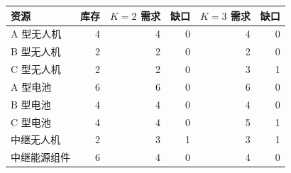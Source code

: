 \begin{tabular}{lrrrrr}
\toprule
资源 & 库存 & $K=2$ 需求 & 缺口 & $K=3$ 需求 & 缺口 \\
\midrule
A 型无人机 & 4 & 4 & 0 & 4 & 0 \\
B 型无人机 & 2 & 2 & 0 & 2 & 0 \\
C 型无人机 & 2 & 2 & 0 & 3 & 1 \\
A 型电池 & 6 & 6 & 0 & 6 & 0 \\
B 型电池 & 4 & 4 & 0 & 4 & 0 \\
C 型电池 & 4 & 4 & 0 & 5 & 1 \\
中继无人机 & 2 & 3 & 1 & 3 & 1 \\
中继能源组件 & 6 & 4 & 0 & 4 & 0 \\
\bottomrule
\end{tabular}
